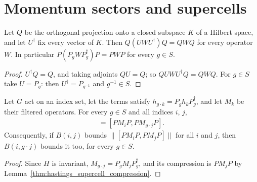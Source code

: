 \section{Momentum sectors and supercells}
\label{sec:translations_supercells}

\begin{lemma}
    \label{thm:hastings_supercell_compression}
    \leanok
    Let $Q$ be the orthogonal projection onto a closed subspace $K$ of a Hilbert
    space, and let $U^\dagger$ fix every vector of $K$. Then
    $Q(UWU^\dagger)Q=QWQ$ for every operator $W$. In particular
    $P(P_gWP_g^\dagger)P=PWP$ for every $g\in S$.
\end{lemma}
\begin{proof}\leanok
    $U^\dagger Q=Q$, and taking adjoints $QU=Q$; so
    $QUWU^\dagger Q=QWQ$. For $g\in S$ take $U=P_g$: then
    $U^\dagger=P_{g^{-1}}$ and $g^{-1}\in S$.
\end{proof}

\begin{lemma}
    \label{thm:hastings_supercell_commutator}
    \leanok
    Let $G$ act on an index set, let the terms satisfy
    $h_{g\cdot k}=P_gh_kP_g^\dagger$, and let $M_k$ be their filtered operators.
    For every $g\in S$ and all indices $i$, $j$,
    \begin{align}
        [PM_iP,PM_jP]=[PM_iP,PM_{g\cdot j}P].
    \end{align}
    Consequently, if $B(i,j)$ bounds $\|[PM_iP,PM_jP]\|$ for all $i$ and $j$,
    then $B(i,g\cdot j)$ bounds it too, for every $g\in S$.
\end{lemma}
\begin{proof}\leanok
    Since $H$ is invariant, $M_{g\cdot j}=P_gM_jP_g^\dagger$, and its
    compression is $PM_jP$ by Lemma~\ref{thm:hastings_supercell_compression}.
\end{proof}

